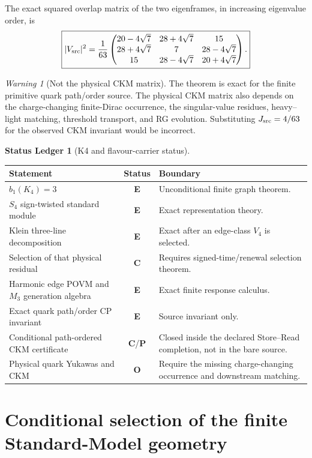 \documentclass[11pt,oneside,openany]{book}
\numberwithin{equation}{chapter}
\theoremstyle{definition}
\newtheorem{ledger}[theorem]{Status Ledger}
\theoremstyle{remark}
\newtheorem{warning}[theorem]{Warning}
\newcommand{\statusE}{\textcolor{ExactColor}{\textbf{E}}}
\newcommand{\statusC}{\textcolor{CondColor}{\textbf{C}}}
\newcommand{\statusP}{\textcolor{PostColor}{\textbf{P}}}
\newcommand{\statusO}{\textcolor{OpenColor}{\textbf{O}}}
\begin{document}
The exact squared overlap matrix of the two eigenframes, in increasing eigenvalue order, is
\[
 \boxed{
 |V_{\rm src}|^2
 =\frac1{63}
 \begin{pmatrix}
 20-4\sqrt7&28+4\sqrt7&15\\
 28+4\sqrt7&7&28-4\sqrt7\\
 15&28-4\sqrt7&20+4\sqrt7
 \end{pmatrix}.}
\]

\begin{warning}[Not the physical CKM matrix]
The theorem is exact for the finite primitive quark path/order source.  The physical CKM matrix also depends on the charge-changing finite-Dirac occurrence, the singular-value residues, heavy--light matching, threshold transport, and RG evolution.  Substituting $J_{\rm src}=4/63$ for the observed CKM invariant would be incorrect.
\end{warning}

\begin{ledger}[K4 and flavour-carrier status]
\begin{center}
\begin{tabularx}{0.96\textwidth}{@{}p{}cX@{}}
\toprule
Statement & Status & Boundary\\
\midrule
$b_1(K_4)=3$ & \statusE & Unconditional finite graph theorem.\\
$S_4$ sign-twisted standard module & \statusE & Exact representation theory.\\
Klein three-line decomposition & \statusE & Exact after an edge-class $V_4$ is selected.\\
Selection of that physical residual & \statusC & Requires signed-time/renewal selection theorem.\\
Harmonic edge POVM and $M_3$ generation algebra & \statusE & Exact finite response calculus.\\
Exact quark path/order CP invariant & \statusE & Source invariant only.\\
Conditional path-ordered CKM certificate & \statusC/\statusP & Closed inside the declared Store--Read completion, not in the bare source.\\
Physical quark Yukawas and CKM & \statusO & Require the missing charge-changing occurrence and downstream matching.\\
\bottomrule
\end{tabularx}
\end{center}
\end{ledger}

\part{Conditional selection of the finite Standard-Model geometry}
\end{document}
